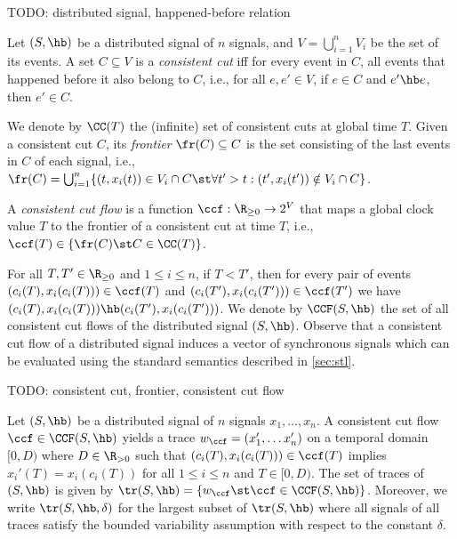 \begin{example}
	\alert{TODO: distributed signal, happened-before relation}
\end{example}

\begin{definition}
	Let $(S, {\hb})$ be a distributed signal of $n$ signals, and $V = \bigcup_{i = 1}^{n} V_i$ be the set of its events.
	A set $C \subseteq V$ is a \emph{consistent cut} iff for every event in $C$, all events that happened before  it also belong to $C$, i.e., for all $e, e' \in V$, if $e \in C$ and $e' \hb e$, then $e' \in C$.
\end{definition}

We denote by $\CC(T)$ the (infinite) set of consistent cuts at global time $T$.
Given a consistent cut $C$, its \emph{frontier} $\fr(C) \subseteq C$ is the set consisting of the last events in $C$ of each signal, i.e., $\fr(C) = \bigcup_{i = 1}^{n} \{ (t, x_i(t)) \in V_i \cap C \st \forall t' > t : (t', x_i(t')) \notin V_i \cap C \}$.

\begin{definition}
A \emph{consistent cut flow} is a function $\ccf : \R_{\geq 0} \to 2^V$ that maps a global clock value $T$ to the frontier of a consistent cut at time $T$, i.e., $\ccf(T) \in \{\fr(C) \st C \in \CC(T)\}$.
\end{definition}

For all $T,T' \in \R_{\geq 0}$ and $1 \leq i \leq n$, if $T < T'$, then for every pair of events $(c_i(T), x_i(c_i(T))) \in \ccf(T)$ and $(c_i(T'), x_i(c_i(T'))) \in \ccf(T')$ we have $(c_i(T), x_i(c_i(T))) \hb (c_i(T'), x_i(c_i(T')))$.
We denote by $\CCF(S,{\hb})$ the set of all consistent cut flows of the distributed signal $(S,{\hb})$.
Observe that a consistent cut flow of a distributed signal induces a vector of synchronous signals which can be evaluated using the standard semantics described in \cref{sec:stl}.

\begin{example}
	\alert{TODO: consistent cut, frontier, consistent cut flow}
\end{example}

Let $(S,{\hb})$ be a distributed signal of $n$ signals $x_1, \ldots, x_n$.
A consistent cut flow $\ccf \in \CCF(S,{\hb})$ yields a trace $w_{\ccf} = (x'_1, \ldots x'_n)$ on a temporal domain $[0,D)$ where $D \in \R_{> 0}$ such that $(c_i(T), x_i(c_i(T))) \in \ccf(T)$ implies $x_i'(T) = x_i(c_i(T))$ for all $1 \leq i \leq n$ and $T \in [0, D)$.
The set of traces of $(S,{\hb})$ is given by $\tr(S,{\hb}) = \{ w_{\ccf} \st \ccf \in \CCF(S,{\hb})\}$.
\alert{Moreover, we write $\tr(S,{\hb},\delta)$ for the largest subset of $\tr(S,{\hb})$ where all signals of all traces satisfy the bounded variability assumption with respect to the constant $\delta$.}

